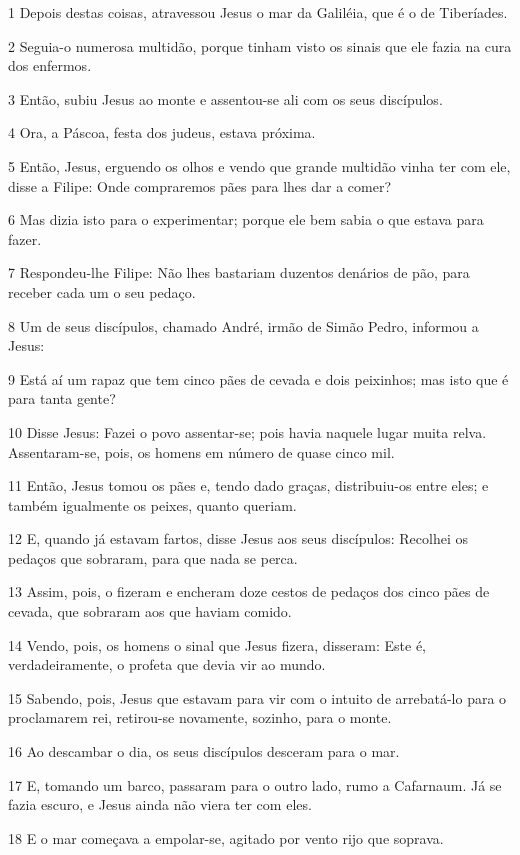 \par 1 Depois destas coisas, atravessou Jesus o mar da Galiléia, que é o de Tiberíades.
\par 2 Seguia-o numerosa multidão, porque tinham visto os sinais que ele fazia na cura dos enfermos.
\par 3 Então, subiu Jesus ao monte e assentou-se ali com os seus discípulos.
\par 4 Ora, a Páscoa, festa dos judeus, estava próxima.
\par 5 Então, Jesus, erguendo os olhos e vendo que grande multidão vinha ter com ele, disse a Filipe: Onde compraremos pães para lhes dar a comer?
\par 6 Mas dizia isto para o experimentar; porque ele bem sabia o que estava para fazer.
\par 7 Respondeu-lhe Filipe: Não lhes bastariam duzentos denários de pão, para receber cada um o seu pedaço.
\par 8 Um de seus discípulos, chamado André, irmão de Simão Pedro, informou a Jesus:
\par 9 Está aí um rapaz que tem cinco pães de cevada e dois peixinhos; mas isto que é para tanta gente?
\par 10 Disse Jesus: Fazei o povo assentar-se; pois havia naquele lugar muita relva. Assentaram-se, pois, os homens em número de quase cinco mil.
\par 11 Então, Jesus tomou os pães e, tendo dado graças, distribuiu-os entre eles; e também igualmente os peixes, quanto queriam.
\par 12 E, quando já estavam fartos, disse Jesus aos seus discípulos: Recolhei os pedaços que sobraram, para que nada se perca.
\par 13 Assim, pois, o fizeram e encheram doze cestos de pedaços dos cinco pães de cevada, que sobraram aos que haviam comido.
\par 14 Vendo, pois, os homens o sinal que Jesus fizera, disseram: Este é, verdadeiramente, o profeta que devia vir ao mundo.
\par 15 Sabendo, pois, Jesus que estavam para vir com o intuito de arrebatá-lo para o proclamarem rei, retirou-se novamente, sozinho, para o monte.
\par 16 Ao descambar o dia, os seus discípulos desceram para o mar.
\par 17 E, tomando um barco, passaram para o outro lado, rumo a Cafarnaum. Já se fazia escuro, e Jesus ainda não viera ter com eles.
\par 18 E o mar começava a empolar-se, agitado por vento rijo que soprava.
